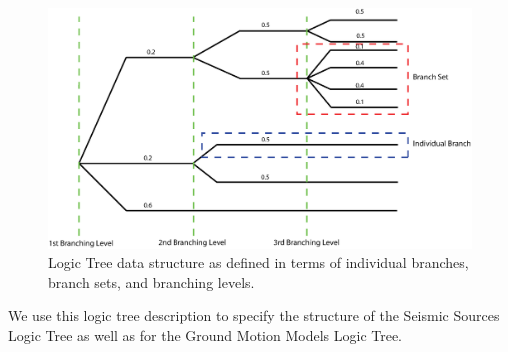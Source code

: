 \begin{figure}
\includegraphics[width=15cm]{./Figures/Part_Hazard/LogicTreeGeneralStructure.eps}
\caption{Logic Tree data structure as defined in terms of individual branches, 
branch sets, and branching levels.}
\label{fig:LogicTreeGeneralStructure}
\end{figure}

We use this logic tree description to specify the structure of the Seismic 
Sources Logic Tree as well as for the Ground Motion Models Logic Tree. 
